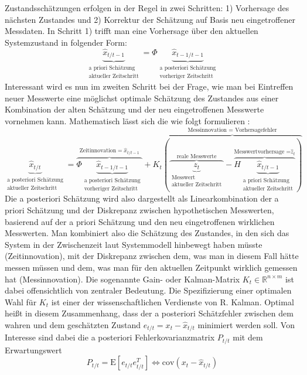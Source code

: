 \documentclass[12pt,a4paper,headsepline,bibliography=totoc,listof=totoc,headinclude=false,footinclude=false,BCOR5mm]{scrreprt} %
\begin{document}
Zustandssch{\"a}tzungen erfolgen in der Regel in zwei Schritten: 1) Vorhersage des n{\"a}chsten Zustandes und 2) Korrektur der Sch{\"a}tzung auf Basis neu eingetroffener Messdaten. In Schritt 1) trifft man eine Vorhersage {\"u}ber den aktuellen Systemzustand in folgender Form:
 \begin{equation}\label{predict} \underbrace{\hat{x}_{t/t-1}}_{\substack{\text{a priori Sch{\"a}tzung} \\ \text{aktueller Zeitschritt}}} = \Phi  \underbrace{\hat{x}_{t-1/t-1}}_{\substack{\text{a posteriori Sch{\"a}tzung}\\ \text{vorheriger Zeitschritt}}}
 \end{equation}
Interessant wird es nun im zweiten Schritt bei der Frage, wie man bei Eintreffen neuer Messwerte eine m{\"o}glichst optimale Sch{\"a}tzung des Zustandes aus einer Kombination der alten Sch{\"a}tzung und der neu eingetroffenen Messwerte vornehmen kann. Mathematisch l{\"a}sst sich die wie folgt formulieren \cite{Sorenson1970}:
 \begin{equation}\label{update} \underbrace{\hat{x}_{t/t}}_{\substack{\text{a posteriori Sch{\"a}tzung}\\ \text{aktueller Zeitschritt}}} = \overbrace{\Phi  \underbrace{\hat{x}_{t-1/t-1}}_{\substack{\text{a posteriori Sch{\"a}tzung}\\ \text{vorheriger Zeitschritt}}}}^{\text{Zeitinnovation}= \hat{x}_{t/t-1}}+ K_t \overbrace{\left(\overbrace{\underbrace{z_t}_{\substack{\text{Messwert}\\ \text{aktueller Zeitschritt}}}}^{\text{reale Messwerte}} - \overbrace{H \underbrace{\hat{x}_{t/t-1}}_{\substack{\text{a priori Sch{\"a}tzung}\\ \text{aktueller Zeitschritt}}}}^{\text{Messwertvorhersage =}\hat{z}_t}\right)}^{\text{Messinnovation = Vorhersagefehler}}
 \end{equation}
Die a posteriori Sch{\"a}tzung wird also dargestellt als Linearkombination der a priori Sch{\"a}tzung und der Diskrepanz zwischen hypothetischen Messwerten, basierend auf der a priori Sch{\"a}tzung und den neu eingetroffenen wirklichen Messwerten. Man kombiniert also die Sch{\"a}tzung des Zustandes, in den sich das System in der Zwischenzeit laut Systemmodell hinbewegt haben m{\"u}sste (Zeitinnovation), mit der Diskrepanz zwischen dem, was man in diesem Fall h{\"a}tte messen m{\"u}ssen und dem, was man f{\"u}r den aktuellen Zeitpunkt wirklich gemessen hat (Messinnovation). Die sogenannte Gain- oder Kalman-Matrix $K_t \in \mathbb{R}^{n \times m} $ ist dabei offensichtlich von zentraler Bedeutung. Die Spezifizierung einer optimalen Wahl f{\"u}r $K_t$ ist einer der wissenschaftlichen Verdienste von R. Kalman.  Optimal heißt in diesem Zusammenhang, dass der a posteriori Sch{\"a}tzfehler zwischen dem wahren und dem geschätzten Zustand $e_{t/t} = x_t -  \hat{x}_{t/t}$ minimiert werden soll. Von Interesse sind dabei die  a posteriori Fehlerkovarianzmatrix  $P_{t/t}$ mit dem Erwartungswert \begin{equation}\label{aposteriorifehler} P_{t/t}=\text{E}[e_{t/t} e_{t/t}^T]\Leftrightarrow \text{cov}(x_t -  \hat{x}_{t/t})  \end{equation}
\end{document}
